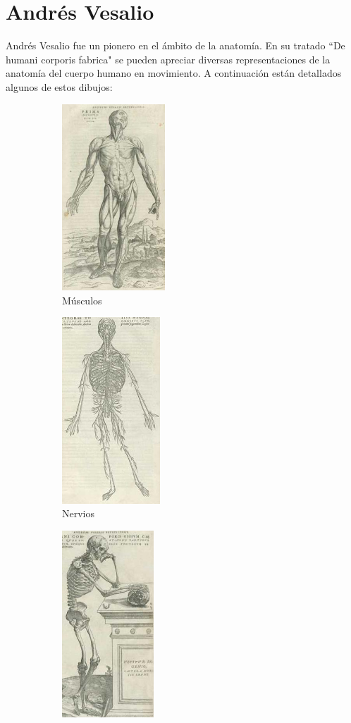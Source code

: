 \section{Andrés Vesalio} \label{app:vesalio}

Andrés Vesalio fue un pionero en el ámbito de la anatomía. En su tratado ``De humani corporis fabrica" se pueden apreciar diversas representaciones de la anatomía del cuerpo humano en movimiento. A continuación están detallados algunos de estos dibujos:
\begin{figure}[h!]
    \centering
        \begin{subfigure}[b]{0.3\textwidth}
             \includegraphics[height=7cm]{musculos.jpg}
             \caption{Músculos}
        \end{subfigure}
        \begin{subfigure}[b]{0.3\textwidth}
             \includegraphics[height=7cm]{nervios.jpg}
             \caption{Nervios}
        \end{subfigure}
        \begin{subfigure}[b]{0.3\textwidth}
            \includegraphics[height=7cm]{esqueleto.jpg}

\end{subfigure}
\end{figure}
